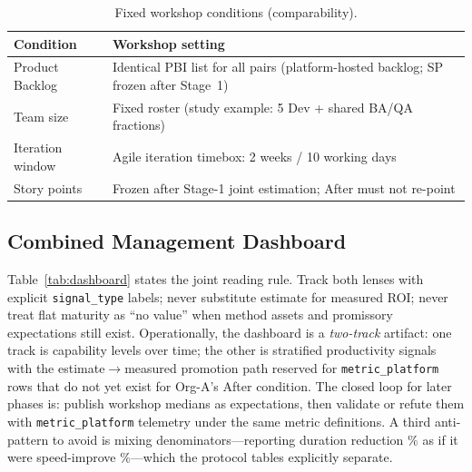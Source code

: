 \documentclass[10pt,conference]{IEEEtran}
\begin{document}
\begin{table}[!t]
\centering
\caption{Fixed workshop conditions (comparability).}
\label{tab:workshop-fixed}
\footnotesize
\setlength{\tabcolsep}{2pt}
\begin{tabular}{@{}>{\raggedright\arraybackslash}p{}>{\raggedright\arraybackslash}p{}@{}}
\toprule
Condition & Workshop setting \\
\midrule
Product Backlog & Identical PBI list for all pairs (platform-hosted backlog; SP frozen after Stage~1) \\
Team size & Fixed roster (study example: 5 Dev + shared BA/QA fractions) \\
Iteration window & Agile iteration timebox: 2 weeks / 10 working days \\
Story points & Frozen after Stage-1 joint estimation; After must not re-point \\
\bottomrule
\end{tabular}
\end{table}

\subsection{Combined Management Dashboard}
\label{sec:scheme-dashboard}

Table~\ref{tab:dashboard} states the joint reading rule.
Track both lenses with explicit \texttt{signal\_type} labels; never substitute estimate for measured ROI; never treat flat maturity as ``no value'' when method assets and promissory expectations still exist.
Operationally, the dashboard is a \emph{two-track} artifact: one track is capability levels over time; the other is stratified productivity signals with the estimate$\rightarrow$measured promotion path reserved for \texttt{metric\_platform} rows that do not yet exist for Org-A's After condition.
The closed loop for later phases is: publish workshop medians as expectations, then validate or refute them with \texttt{metric\_platform} telemetry under the same metric definitions.
A third anti-pattern to avoid is mixing denominators---reporting duration reduction $\%$ as if it were speed-improve $\%$---which the protocol tables explicitly separate.
\end{document}
